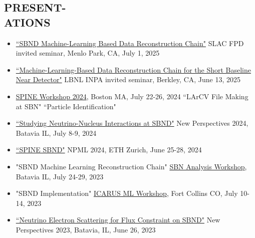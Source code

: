\documentclass[margin, 10pt]{res} %
\begin{document}
\begin{resume}

\section{PRESENT-\\ATIONS}%
\begin{itemize}
    \item \href{https://indico.slac.stanford.edu/event/9890/}{``SBND Machine-Learning Based Data Reconstruction Chain"} SLAC FPD invited seminar, Menlo Park, CA, July 1, 2025
    \item \href{https://inpa.lbl.gov/event/inpa-seminar-speaker-tba-3/}{``Machine-Learning-Based Data Reconstruction Chain for the Short Baseline Near Detector"} LBNL INPA invited seminar, Berkley, CA, June 13, 2025
    \item \href{https://indico.slac.stanford.edu/event/8926/}{SPINE Workshop 2024}, Boston MA, July 22-26, 2024
    \subitem ``LArCV File Making at SBN"
    \subitem ``Particle Identification" 
    \item \href{https://indico.fnal.gov/event/64625/contributions/295270/}{``Studying Neutrino-Nucleus Interactions at SBND"} New Perspectives 2024, Batavia IL, July 8-9, 2024
    \item \href{https://indico.phys.ethz.ch/event/113/contributions/865/}{``SPINE SBND"} NPML 2024, ETH Zurich, June 25-28, 2024
    \item "SBND Machine Learning Reconstruction Chain" \href{https://indico.fnal.gov/event/59757/}{SBN Analysis Workshop}, Batavia IL, July 24-29, 2023
    \item "SBND Implementation" \href{https://indico.slac.stanford.edu/event/7979/}{ICARUS ML Workshop}, Fort Collins CO, July 10-14, 2023 
    \item \href{https://indico.fnal.gov/event/59506/contributions/269960/}{``Neutrino Electron Scattering for Flux Constraint on SBND"} New Perspectives 2023, Batavia, IL, June 26, 2023

\end{itemize}
\end{resume}
\end{document}
